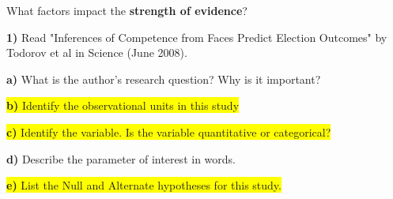 \documentclass{article}
\newif\ifPrintSolution
\newcommand{\sol}[1]{\ifPrintSolution {\color{blue} #1 } \fi}
\begin{document}
\vspace{0.5in}

What factors impact the \textbf{strength of evidence}?

\sol{Distance from the Null\\
Sample Size\\
1 Tail vs 2 Tail test}




\pagebreak

\textbf{1) } Read "Inferences of Competence from Faces Predict Election Outcomes" by Todorov et al in Science
(June 2008).

\hspace{0.1in} \textbf{a) } What is the author's research question? Why is it important?

\sol{Can snap-judgement inferences of competence based on facial appearance predict election results?\\
Answers may vary; it provides insight into our election process and questions how rational and deliberative they are}

\hspace{0.25in} 

\hspace{0.1in} \colorbox{yellow}{\textbf{b) } Identify the observational units in this study}

\sol{Each individual congressional election}

\vspace{.25in}

\hspace{0.1in} \colorbox{yellow}{\textbf{c) } Identify the variable.  Is the variable quantitative or categorical?}

\sol{The variable is if the candidate who was deemed more competent was the winner of the election; it is categorical}

\vspace{.25in}

\hspace{0.1in} \textbf{d) } Describe the parameter of interest in words.


\sol{The long run proportion of candidates who are deemed more competent that win their respective congressional election}

\vspace{.25in}

\hspace{0.1in} \colorbox{yellow}{\textbf{e) } List the Null and Alternate hypotheses for this study.}
\end{document}
